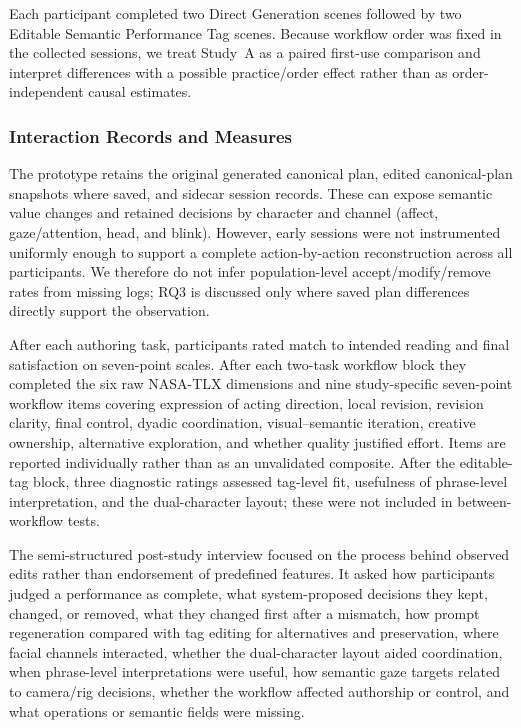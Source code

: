 Each participant completed two Direct Generation scenes followed by two Editable Semantic Performance Tag scenes. Because workflow order was fixed in the collected sessions, we treat Study~A as a paired first-use comparison and interpret differences with a possible practice/order effect rather than as order-independent causal estimates.

\subsubsection{Interaction Records and Measures}

The prototype retains the original generated canonical plan, edited canonical-plan snapshots where saved, and sidecar session records. These can expose semantic value changes and retained decisions by character and channel (affect, gaze/attention, head, and blink). However, early sessions were not instrumented uniformly enough to support a complete action-by-action reconstruction across all participants. We therefore do not infer population-level accept/modify/remove rates from missing logs; RQ3 is discussed only where saved plan differences directly support the observation.

After each authoring task, participants rated match to intended reading and final satisfaction on seven-point scales. After each two-task workflow block they completed the six raw NASA-TLX dimensions \cite{hart1988nasa} and nine study-specific seven-point workflow items covering expression of acting direction, local revision, revision clarity, final control, dyadic coordination, visual--semantic iteration, creative ownership, alternative exploration, and whether quality justified effort. Items are reported individually rather than as an unvalidated composite. After the editable-tag block, three diagnostic ratings assessed tag-level fit, usefulness of phrase-level interpretation, and the dual-character layout; these were not included in between-workflow tests.

The semi-structured post-study interview focused on the process behind observed edits rather than endorsement of predefined features. It asked how participants judged a performance as complete, what system-proposed decisions they kept, changed, or removed, what they changed first after a mismatch, how prompt regeneration compared with tag editing for alternatives and preservation, where facial channels interacted, whether the dual-character layout aided coordination, when phrase-level interpretations were useful, how semantic gaze targets related to camera/rig decisions, whether the workflow affected authorship or control, and what operations or semantic fields were missing.

